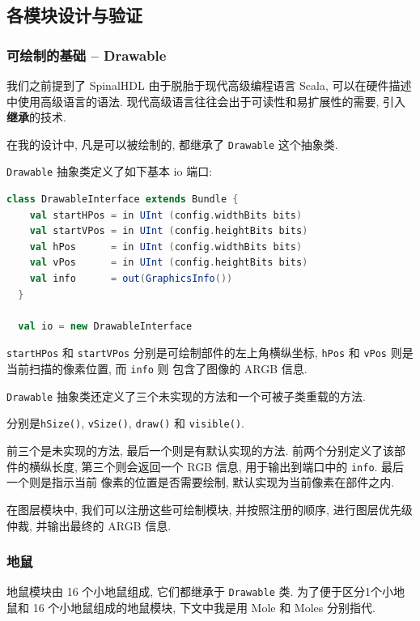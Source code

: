 \subsection{各模块设计与验证}

\subsubsection{可绘制的基础 -- Drawable}

我们之前提到了 SpinalHDL 由于脱胎于现代高级编程语言 Scala, 可以在硬件描述中使用高级语言的语法. 
现代高级语言往往会出于可读性和易扩展性的需要, 引入\textbf{继承}的技术. 

在我的设计中, 凡是可以被绘制的, 都继承了 \texttt{Drawable} 这个抽象类. 

\texttt{Drawable} 抽象类定义了如下基本 io 端口: 

\begin{lstlisting}[language=scala]
  class DrawableInterface extends Bundle {
    val startHPos = in UInt (config.widthBits bits)
    val startVPos = in UInt (config.heightBits bits)
    val hPos      = in UInt (config.widthBits bits)
    val vPos      = in UInt (config.heightBits bits)
    val info      = out(GraphicsInfo())
  }

  val io = new DrawableInterface
\end{lstlisting}

\texttt{startHPos} 和 \texttt{startVPos} 分别是可绘制部件的左上角横纵坐标, 
\texttt{hPos} 和 \texttt{vPos} 则是当前扫描的像素位置, 而 \texttt{info} 则
包含了图像的 ARGB 信息. 

\texttt{Drawable} 抽象类还定义了三个未实现的方法和一个可被子类重载的方法. 

分别是\texttt{hSize()}, \texttt{vSize()}, \texttt{draw()} 和 \texttt{visible()}. 

前三个是未实现的方法, 最后一个则是有默认实现的方法. 前两个分别定义了该部件的横纵长度, 
第三个则会返回一个 RGB 信息, 用于输出到端口中的 \texttt{info}. 最后一个则是指示当前
像素的位置是否需要绘制, 默认实现为当前像素在部件之内. 

在图层模块中, 我们可以注册这些可绘制模块, 并按照注册的顺序, 进行图层优先级仲裁, 
并输出最终的 ARGB 信息. 

\subsubsection{地鼠}

地鼠模块由 16 个小地鼠组成, 它们都继承于 \texttt{Drawable} 类. 为了便于区分1个小地鼠和
16 个小地鼠组成的地鼠模块, 下文中我是用 Mole 和 Moles 分别指代. 

